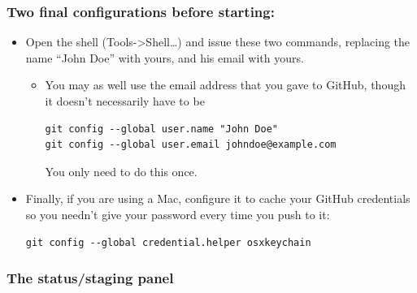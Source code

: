 \documentclass[]{book}
\theoremstyle{definition}
\theoremstyle{definition}
\theoremstyle{remark}
\begin{document}
\subsubsection{Two final configurations before
starting:}\label{two-final-configurations-before-starting}

\begin{itemize}
\item
  Open the shell (Tools-\textgreater{}Shell\ldots{}) and issue these two
  commands, replacing the name ``John Doe'' with yours, and his email
  with yours.

  \begin{itemize}
  \item
    You may as well use the email address that you gave to GitHub,
    though it doesn't necessarily have to be

\begin{verbatim}
git config --global user.name "John Doe"
git config --global user.email johndoe@example.com
\end{verbatim}

    You only need to do this once.
  \end{itemize}
\item
  Finally, if you are using a Mac, configure it to cache your GitHub
  credentials so you needn't give your password every time you push to
  it:

\begin{verbatim}
git config --global credential.helper osxkeychain
\end{verbatim}
\end{itemize}

\subsubsection{The status/staging panel}\label{the-statusstaging-panel}
\end{document}
